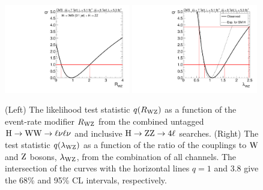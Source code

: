 \documentclass[11pt,twoside,a4paper,cmspaper,final,collab]{cms-tdr}
\begin{document}
\begin{figure}[bhtp]
\centering
\includegraphics[width=0.49\textwidth]{figures/comb/sqr_rwz_scan_1d_ggH_HPA} \hfill
\includegraphics[width=0.49\textwidth]{figures/comb/sqr_lwz_scan_1d_all}
\caption{
(Left) The likelihood test statistic $q(R_{\mathrm{W}\mathrm{Z}})$ as a function of the event-rate modifier $R_{\mathrm{W}\mathrm{Z}}$
from the combined untagged $\mathrm{H} \to \mathrm{W}\mathrm{W} \to \ell\nu\ell\nu$ and
inclusive $\mathrm{H} \to \mathrm{Z}\mathrm{Z} \to  4\ell$ searches.
(Right) The test statistic  $q(\lambda_{\mathrm{W}\mathrm{Z}})$  as a function of the ratio of the couplings to $\mathrm{W}$ and $\mathrm{Z}$
 bosons, $\lambda_{\mathrm{W}\mathrm{Z}}$,
   from the combination of all channels.
The intersection  of the curves with the horizontal lines $q= 1$ and 3.8 give the 68\% and 95\% CL intervals, respectively.
}
\label{fig:fit_rwz_scan}
\end{figure}
\end{document}
